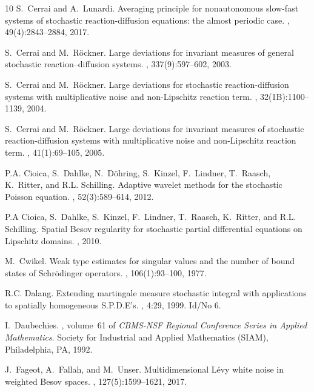 \documentclass[reqno]{amsart}
\theoremstyle{plain}
\theoremstyle{remark}
\theoremstyle{plain}
\numberwithin{equation}{section}
\newcommand{\1}{\one}
\begin{document}
\begin{thebibliography}{10}
S.~Cerrai and A.~Lunardi.
\newblock Averaging principle for nonautonomous slow-fast systems of stochastic
  reaction-diffusion equations: the almost periodic case.
, 49(4):2843--2884, 2017.

S.~Cerrai and M.~R{\"o}ckner.
\newblock Large deviations for invariant measures of general stochastic
  reaction--diffusion systems.
, 337(9):597--602, 2003.

S.~Cerrai and M.~R\"{o}ckner.
\newblock Large deviations for stochastic reaction-diffusion systems with
  multiplicative noise and non-{L}ipschitz reaction term.
, 32(1B):1100--1139, 2004.

S.~Cerrai and M.~R\"{o}ckner.
\newblock Large deviations for invariant measures of stochastic
  reaction-diffusion systems with multiplicative noise and non-{L}ipschitz
  reaction term.
, 41(1):69--105,
  2005.

P.A. Cioica, S.~Dahlke, N.~D{\"o}hring, S.~Kinzel, F.~Lindner, T.~Raasch,
  K.~Ritter, and R.L. Schilling.
\newblock Adaptive wavelet methods for the stochastic {Poisson} equation.
, 52(3):589--614, 2012.

P.A Cioica, S.~Dahlke, S.~Kinzel, F.~Lindner, T.~Raasch, K.~Ritter, and R.L.
  Schilling.
\newblock Spatial {B}esov regularity for stochastic partial differential
  equations on {L}ipschitz domains.
, 2010.

M.~Cwikel.
\newblock Weak type estimates for singular values and the number of bound
  states of {S}chr\"{o}dinger operators.
, 106(1):93--100, 1977.

R.C. Dalang.
\newblock Extending martingale measure stochastic integral with applications to
  spatially homogeneous {S}.{P}.{D}.{E}'s.
, 4:29, 1999.
\newblock Id/No 6.

I.~Daubechies.
, volume~61 of {\em CBMS-NSF Regional
  Conference Series in Applied Mathematics}.
\newblock Society for Industrial and Applied Mathematics (SIAM), Philadelphia,
  PA, 1992.

J.~Fageot, A.~Fallah, and M.~Unser.
\newblock Multidimensional {L{\'e}vy} white noise in weighted {Besov} spaces.
, 127(5):1599--1621, 2017.


\end{thebibliography}
\end{document}
